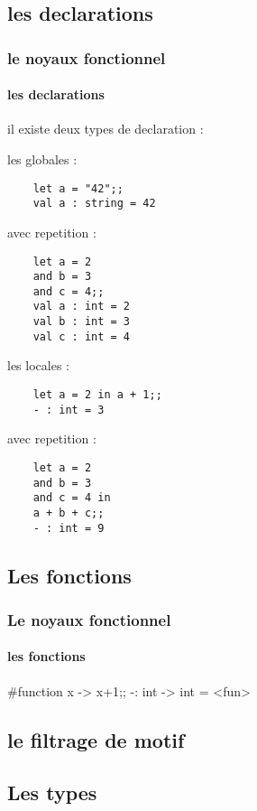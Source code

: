     \subsection{les declarations}
\begin{frame}[fragile]
      \frametitle{le noyaux fonctionnel}
      \framesubtitle{les declarations}
      il existe deux types de declaration :
     \begin{minipage}[t]{5cm}
	les globales :\\
	\begin{lstlisting}
	let a = "42";;
	val a : string = 42
	\end{lstlisting}
	avec repetition :
	\begin{lstlisting}
	let a = 2
	and b = 3
	and c = 4;;
	val a : int = 2
	val b : int = 3
	val c : int = 4
	\end{lstlisting}
      \end{minipage}
      \begin{minipage}[t]{5cm}
	les locales :\\
	\begin{lstlisting}
	let a = 2 in a + 1;;
	- : int = 3
	\end{lstlisting}
	avec repetition :
	\begin{lstlisting}
	let a = 2
	and b = 3
	and c = 4 in
	a + b + c;;
	- : int = 9
	\end{lstlisting}
      \end{minipage}
\end{frame}

    \subsection{Les fonctions}
    \begin{frame}
      \frametitle{Le noyaux fonctionnel}
      \framesubtitle{les fonctions}
      \#function x -> x+1;;
      -: int -> int = <fun>
    \end{frame}

      \subsection{le filtrage de motif}
      \begin{frame}
      \end{frame}

      \subsection{Les types}
      \begin{frame}
      \end{frame}
